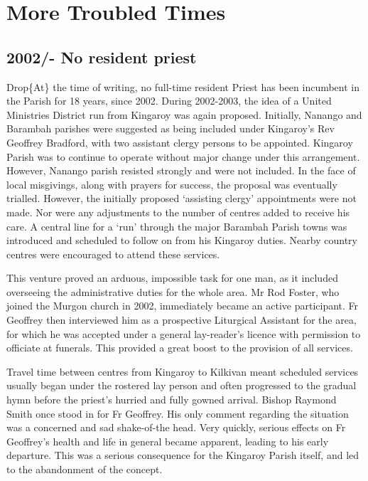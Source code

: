 \hypertarget{more-troubled-times}{%
\chapter{More Troubled Times}\label{more-troubled-times}}

\hypertarget{no-resident-priest}{%
\section{2002/- No resident priest}\label{no-resident-priest}}

Drop\{At\} the time of writing, no full-time resident Priest has been incumbent in the Parish for 18 years, since 2002. During 2002-2003, the idea of a United Ministries District run from Kingaroy was again proposed. Initially, Nanango and Barambah parishes were suggested as being included under Kingaroy's Rev Geoffrey Bradford, with two assistant clergy persons to be appointed. Kingaroy Parish was to continue to operate without major change under this arrangement. However, Nanango parish resisted strongly and were not included. In the face of local misgivings, along with prayers for success, the proposal was eventually trialled. However, the initially proposed `assisting clergy' appointments were not made. Nor were any adjustments to the number of centres added to receive his care. A central line for a `run' through the major Barambah Parish towns was introduced and scheduled to follow on from his Kingaroy duties. Nearby country centres were encouraged to attend these services.

This venture proved an arduous, impossible task for one man, as it included overseeing the administrative duties for the whole area. Mr Rod Foster, who joined the Murgon church in 2002, immediately became an active participant. Fr Geoffrey then interviewed him as a prospective Liturgical Assistant for the area, for which he was accepted under a general lay-reader's licence with permission to officiate at funerals. This provided a great boost to the provision of all services.

Travel time between centres from Kingaroy to Kilkivan meant scheduled services usually began under the rostered lay person and often progressed to the gradual hymn before the priest's hurried and fully gowned arrival. Bishop Raymond Smith once stood in for Fr Geoffrey. His only comment regarding the situation was a concerned and sad shake-of-the head. Very quickly, serious effects on Fr Geoffrey's health and life in general became apparent, leading to his early departure. This was a serious consequence for the Kingaroy Parish itself, and led to the abandonment of the concept.

